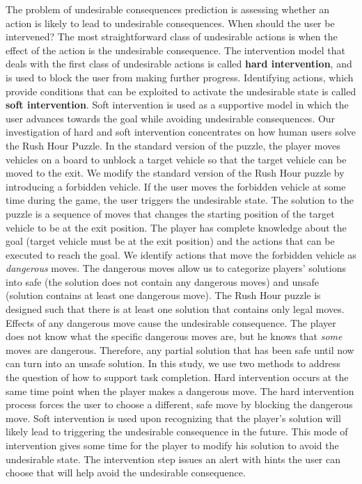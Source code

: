\documentclass[doctor]{thesis} %
\theoremstyle{plain}
\begin{document}
The problem of undesirable consequences prediction is assessing whether an action is likely to lead to undesirable consequences. When should the user be intervened? The most straightforward class of undesirable actions is when the effect of the action is the undesirable consequence. The intervention model that deals with the first class of undesirable actions is called \textbf{hard intervention}, and is used to block the user from making further progress. Identifying actions, which provide conditions that can be exploited to activate the undesirable state is called \textbf{soft intervention}. Soft intervention is used as a supportive model in which the user advances towards the goal while avoiding undesirable consequences. Our investigation of hard and soft intervention concentrates on how human users solve the Rush Hour Puzzle. In the standard version of the puzzle, the player moves vehicles on a board to unblock a target vehicle so that the target vehicle can be moved to the exit. We modify the standard version of the Rush Hour puzzle by introducing a forbidden vehicle. If the user moves the forbidden vehicle at some time during the game, the user triggers the undesirable state. The solution to the puzzle is a sequence of moves that changes the starting position of the target vehicle to be at the exit position. The player has complete knowledge about the goal (target vehicle must be at the exit position) and the actions that can be executed to reach the goal. We identify actions that move the forbidden vehicle as \textit{dangerous} moves. The dangerous moves allow us to categorize players' solutions into safe (the solution does not contain any dangerous moves) and unsafe (solution contains at least one dangerous move). The Rush Hour puzzle is designed such that there is at least one solution that contains only legal moves. Effects of any dangerous move cause the undesirable consequence. The player does not know what the specific dangerous moves are, but he knows that \textit{some} moves are dangerous. Therefore, any partial solution that has been safe until now can turn into an unsafe solution.  In this study, we use two methods to address the question of how to support task completion. Hard intervention occurs at the same time point when the player makes a dangerous move. The hard intervention process forces the user to choose a different, safe move by blocking the dangerous move. Soft intervention is used upon recognizing that the player's solution will likely lead to triggering the undesirable consequence in the future. This mode of intervention gives some time for the player to modify his solution to avoid the undesirable state. The intervention step issues an alert with hints the user can choose that will help avoid the undesirable consequence. 
\end{document}
